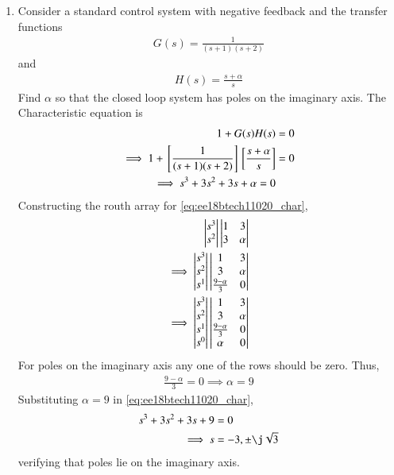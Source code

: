 \begin{enumerate}[label=\thesubsection.\arabic*.,ref=\thesubsection.\theenumi]

\item Consider a standard control system with negative feedback and the transfer functions 
\begin{align}
G(s) = \frac{1}{(s+1)(s+2)}
\end{align}
and
\begin{align}
H(s) = \frac{s+\alpha}{s}
\end{align}
%
Find  $\alpha$ so that 
the closed loop system has poles on the imaginary axis.
\solution The 
Characteristic equation is
\begin{align}
 1 + G(s)H(s) &= 0
\\
\implies 1 + {}\left[\frac{1}{(s+1)(s+2)}\right]{}\left[\frac{s+\alpha}{s}\right] &= 0
\\
\implies s^3+3s^2+3s+\alpha = 0
\label{eq:ee18btech11020_char}
\end{align}
Constructing the routh array for \eqref{eq:ee18btech11020_char},
%
\begin{align}
\begin{vmatrix}s^3\\s^2\end{vmatrix}
\begin{vmatrix}1 & 3 \\ 3 & \alpha \end{vmatrix}
\label{eq:sec_order_op_1}
\\
\implies \begin{vmatrix}s^3\\s^2\\s^1\end{vmatrix}
\begin{vmatrix}1 & 3 \\ 3 & \alpha \\  \frac{9-\alpha}{3} & 0\end{vmatrix} \label{eq:sec_order_op_1}
\\
\implies \begin{vmatrix}s^3\\s^2\\s^1\\s^0\end{vmatrix}
\begin{vmatrix}1 & 3 \\ 3 & \alpha \\  \frac{9-\alpha}{3} & 0\\ \alpha & 0\end{vmatrix} \label{eq:sec_order_op_1}
\end{align}
For poles on the imaginary axis any one of the rows should be zero.  Thus,
\begin{align}
\frac{9-\alpha}{3} = 0
\implies   \alpha = 9
\end{align}
Substituting $\alpha = 9$ in \eqref{eq:ee18btech11020_char},
\begin{align}
s^3+3s^2+3s+9&=0
\\
\implies s &= -3,\pm\j\sqrt{3}
\end{align}
%
verifying that poles lie on the imaginary axis.
\end{enumerate}
